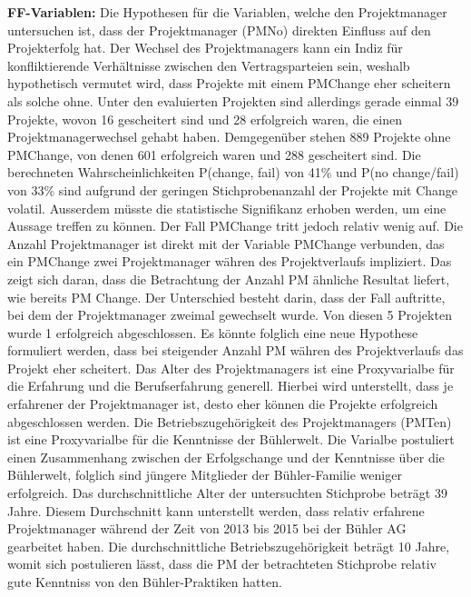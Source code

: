 \newline\textbf{FF-Variablen:} Die Hypothesen für die Variablen, welche den Projektmanager untersuchen ist, dass der Projektmanager (PMNo) direkten Einfluss auf den Projekterfolg hat. Der Wechsel des Projektmanagers kann ein Indiz für konfliktierende Verhältnisse zwischen den Vertragsparteien sein, weshalb hypothetisch vermutet wird, dass Projekte mit einem PMChange eher scheitern als solche ohne. Unter den evaluierten Projekten sind allerdings gerade einmal 39 Projekte, wovon 16 gescheitert sind und 28 erfolgreich waren, die einen Projektmanagerwechsel gehabt haben. Demgegenüber stehen 889 Projekte ohne PMChange, von denen 601 erfolgreich waren und 288 gescheitert sind. Die berechneten Wahrscheinlichkeiten P(change, fail) von 41\% und P(no change/fail) von 33\% sind aufgrund der geringen Stichprobenanzahl der Projekte mit Change volatil. Ausserdem müsste die statistische Signifikanz erhoben werden, um eine Aussage treffen zu können. Der Fall PMChange tritt jedoch relativ wenig auf. Die Anzahl Projektmanager ist direkt mit der Variable PMChange verbunden, das ein PMChange zwei Projektmanager währen des Projektverlaufs impliziert. Das zeigt sich daran, dass die Betrachtung der Anzahl PM ähnliche Resultat liefert, wie bereits PM Change. Der Unterschied besteht darin, dass der Fall auftritte, bei dem der Projektmanager zweimal gewechselt wurde. Von diesen 5 Projekten wurde 1 erfolgreich abgeschlossen. Es könnte folglich eine neue Hypothese formuliert werden, dass bei steigender Anzahl PM währen des Projektverlaufs das Projekt eher scheitert. Das Alter des Projektmanagers ist eine Proxyvarialbe für die Erfahrung und die Berufserfahrung generell. Hierbei wird unterstellt, dass je erfahrener der Projektmanager ist, desto eher können die Projekte erfolgreich abgeschlossen werden. Die Betriebszugehörigkeit des Projektmanagers (PMTen) ist eine Proxyvarialbe für die Kenntnisse der Bühlerwelt. Die Varialbe postuliert einen Zusammenhang zwischen der Erfolgschange und der Kenntnisse über die Bühlerwelt, folglich sind jüngere Mitglieder der Bühler-Familie weniger erfolgreich. Das durchschnittliche Alter der untersuchten Stichprobe beträgt 39 Jahre. Diesem Durchschnitt kann unterstellt werden, dass relativ erfahrene Projektmanager während der Zeit von 2013 bis 2015 bei der Bühler AG gearbeitet haben. Die durchschnittliche Betriebszugehörigkeit beträgt 10 Jahre, womit sich postulieren lässt, dass die PM der betrachteten Stichprobe relativ gute Kenntniss von den Bühler-Praktiken hatten.
